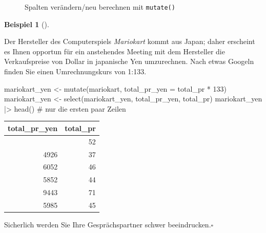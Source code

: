 \documentclass[
  a4paper,
]{scrbook}
\newenvironment{Shaded}{\begin{snugshade}}{\end{snugshade}}
\newcommand{\AttributeTok}[1]{\textcolor[rgb]{0.40,0.45,0.13}{#1}}
\newcommand{\CommentTok}[1]{\textcolor[rgb]{0.37,0.37,0.37}{#1}}
\newcommand{\DecValTok}[1]{\textcolor[rgb]{0.68,0.00,0.00}{#1}}
\newcommand{\FunctionTok}[1]{\textcolor[rgb]{0.28,0.35,0.67}{#1}}
\newcommand{\NormalTok}[1]{\textcolor[rgb]{0.00,0.23,0.31}{#1}}
\newcommand{\OtherTok}[1]{\textcolor[rgb]{0.00,0.23,0.31}{#1}}
\newcommand{\SpecialCharTok}[1]{\textcolor[rgb]{0.37,0.37,0.37}{#1}}
\theoremstyle{definition}
\newtheorem{example}{Beispiel}[chapter]
\theoremstyle{definition}
\theoremstyle{definition}
\theoremstyle{remark}
\begin{document}
\begin{figure}


\caption{\label{fig-mutate}Spalten verändern/neu berechnen mit
\texttt{mutate()}}

\end{figure}%

\begin{example}[]\protect\hypertarget{exm-mutate}{}\label{exm-mutate}

Der Hersteller des Computerspiels \emph{Mariokart} kommt aus Japan;
daher erscheint es Ihnen opportun für ein anstehendes Meeting mit dem
Hersteller die Verkaufspreise von Dollar in japanische Yen umzurechnen.
Nach etwas Googeln finden Sie einen Umrechnungskurs von 1:133.

\begin{Shaded}
\begin{Highlighting}[]
\NormalTok{mariokart\_yen }\OtherTok{\textless{}{-}} 
  \FunctionTok{mutate}\NormalTok{(mariokart, }\AttributeTok{total\_pr\_yen =}\NormalTok{ total\_pr }\SpecialCharTok{*} \DecValTok{133}\NormalTok{)}
\NormalTok{mariokart\_yen }\OtherTok{\textless{}{-}} \FunctionTok{select}\NormalTok{(mariokart\_yen, total\_pr\_yen, total\_pr)}
\NormalTok{mariokart\_yen }\SpecialCharTok{|\textgreater{}} \FunctionTok{head}\NormalTok{()  }\CommentTok{\# nur die ersten paar Zeilen}
\end{Highlighting}
\end{Shaded}

\begin{longtable}[]{@{}rr@{}}
\toprule\noalign{}
total\_pr\_yen & total\_pr \\
\midrule\noalign{}
\endhead
\bottomrule\noalign{}
\endlastfoot
6856 & 52 \\
4926 & 37 \\
6052 & 46 \\
5852 & 44 \\
9443 & 71 \\
5985 & 45 \\
\end{longtable}

Sicherlich werden Sie Ihre Gesprächspartner schwer
beeindrucken.\(\square\)

\end{example}
\end{document}
